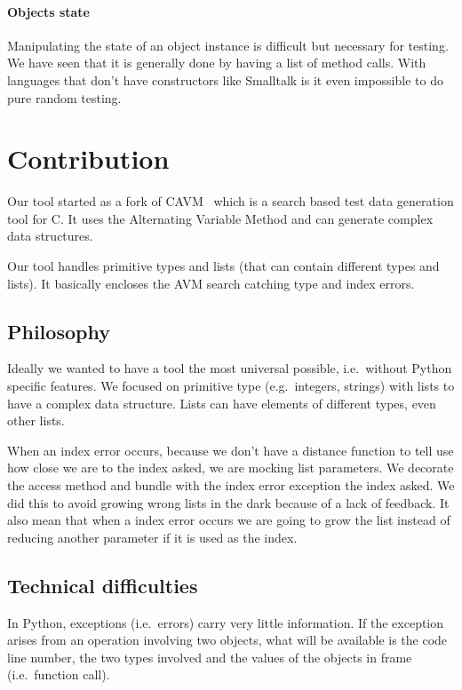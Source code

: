 \documentclass{llncs2e/llncs}
\begin{document}
\paragraph{Objects state} Manipulating the state of an object instance is
difficult but necessary for testing. We have seen that it is generally done by
having a list of method calls. With languages that don't have constructors like
Smalltalk is it even impossible to do pure random testing.


\section{Contribution}
\label{contribution}

Our tool started as a fork of CAVM~\cite{Kim2017ts} which is a search based test
data generation tool for C. It uses the Alternating Variable Method and can
generate complex data structures.

Our tool handles primitive types and lists (that can contain different types and
lists). It basically encloses the AVM search catching type and index errors.

\subsection{Philosophy}
\label{philosophy}

Ideally we wanted to have a tool the most universal possible, i.e.\ without
Python specific features. We focused on primitive type (e.g.\ integers, strings)
with lists to have a complex data structure. Lists can have elements of
different types, even other lists.

When an index error occurs, because we don't have a distance function to tell
use how close we are to the index asked, we are mocking list parameters. We
decorate the access method and bundle with the index error exception the index
asked. We did this to avoid growing wrong lists in the dark because of a lack of
feedback. It also mean that when a index error occurs we are going to grow the
list instead of reducing another parameter if it is used as the index.

\subsection{Technical difficulties}
\label{tech_difficulties}

In Python, exceptions (i.e.\ errors) carry very little information. If the
exception arises from an operation involving two objects, what will be available
is the code line number, the two types involved and the values of the objects in
frame (i.e.\ function call).
\end{document}

